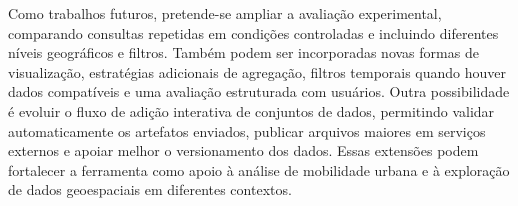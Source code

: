 \documentclass[12pt]{article}
\begin{document}
Como trabalhos futuros, pretende-se ampliar a avaliação experimental, comparando consultas repetidas em condições controladas e incluindo diferentes níveis geográficos e filtros. Também podem ser incorporadas novas formas de visualização, estratégias adicionais de agregação, filtros temporais quando houver dados compatíveis e uma avaliação estruturada com usuários. Outra possibilidade é evoluir o fluxo de adição interativa de conjuntos de dados, permitindo validar automaticamente os artefatos enviados, publicar arquivos maiores em serviços externos e apoiar melhor o versionamento dos dados. Essas extensões podem fortalecer a ferramenta como apoio à análise de mobilidade urbana e à exploração de dados geoespaciais em diferentes contextos.





\end{document}
